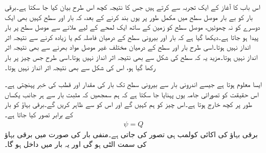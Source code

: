 
اس باب کا آغاز  کے ایک تجربہ سے کرتے ہیں جس کا نتیجہ کچھ اس طرح بیان کیا جا سکتا ہے۔برقی بار  کو بے بار موصل سطح میں مکمل طور پر یوں بند کرنے کے بعد، کہ بار اور سطح  کہیں بھی ایک دوسرے کو نہ چھوئیں، موصل سطح کو زمین کے ساتھ ایک لمحے کے لیے ملانے سے موصل سطح پر  بار پیدا ہو جاتا ہے۔دیکھا گیا ہے کہ بار اور بیرونی سطح کے درمیان فاصلہ کم یا زیادہ کرنے سے نتیجہ اثر انداز نہیں ہوتا۔اسی طرح بار اور سطح کے درمیان مختلف غیر موصل مواد بھرنے سے بھی نتیجہ اثر انداز نہیں ہوتا۔مزید یہ کہ سطح کی شکل سے بھی نتیجہ اثر انداز نہیں ہوتا۔اسی طرح جس چیز پر بار  رکھا گیا ہو، اس کی شکل سے بھی نتیجہ اثر انداز نہیں ہوتا۔ 

ایسا معلوم ہوتا ہے جیسے اندرونی بار سے بیرونی سطح تک بار کی مقدار اور قطب کی خبر پہنچتی ہے۔اس حقیقت کو تصوراتی جامہ یوں پہنایا جا سکتا ہے کہ ہم سمجھیں کہ مثبت بار سے ہر جانب یکساں طور پر کچھ خارج ہوتا ہے۔اس چیز کو ہم   کہیں گے اور اس کو  سے ظاہر کریں گے۔برقی بہاؤ کو بار کے برابر تصور کیا جاتا ہے۔
\begin{align}
\psi=Q
\end{align}
برقی بہاؤ کی اکائی  کولمب  ہی تصور کی جاتی ہے۔منفی بار کی صورت میں برقی بہاؤ کی سمت الٹی ہو گی اور یہ بار میں داخل ہو گا۔

